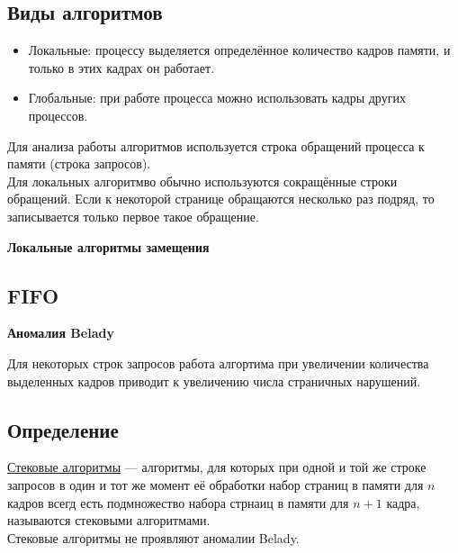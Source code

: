 \documentclass[12pt, a4paper]{article}
\begin{document}
    \subsection*{Виды алгоритмов}
    \begin{itemize}
        \item Локальные: процессу выделяется определённое количество кадров памяти, и только в этих кадрах он работает.
        \item Глобальные: при работе процесса можно использовать кадры других процессов.
    \end{itemize}
    Для анализа работы алгоритмов используется строка обращений процесса к памяти (строка запросов).\\
    Для локальных алгоритмво обычно используются сокращённые строки обращений. Если к некоторой странице обращаются несколько раз подряд, то записывается только первое такое обращение.
    \begin{center}
        \bf Локальные алгоритмы замещения
    \end{center}
    \subsection*{FIFO}
    \begin{center}
        \bf Аномалия Belady
    \end{center}
    Для некоторых строк запросов работа алгортима при увеличении количества выделенных кадров приводит к увеличению числа страничных нарушений.
    \subsection*{Определение}
    \underline{Стековые алгоритмы} --- алгоритмы, для которых при одной и той же строке запросов в один и тот же момент её обработки набор страниц в памяти для $n$ кадров всегд есть подмножество набора стрнаиц в памяти для $n + 1$ кадра, называются стековыми алгоритмами.\\
    Стековые алгоритмы не проявляют аномалии Belady.
\end{document}
